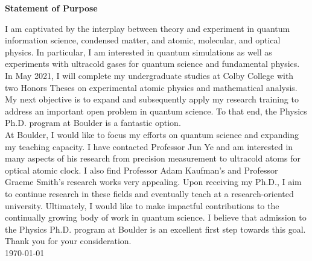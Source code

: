 \documentclass[12pt]{article}
\begin{document}
\begin{center}
	\textbf{Statement of Purpose}
\end{center}
I am captivated by the interplay between theory and experiment in quantum information science, condensed matter, and atomic, molecular, and optical physics. In particular, I am interested in  quantum simulations as well as experiments with ultracold gases for quantum science and fundamental physics. In May 2021, I will complete my undergraduate studies at Colby College with two Honors Theses on experimental atomic physics and mathematical analysis. My next objective is to expand and subsequently apply my research training to address an important open problem in quantum science. To that end, the Physics Ph.D. program at Boulder is a fantastic option.  \\ 

 


At Boulder, I would like to focus my efforts on quantum science and expanding my teaching capacity. I have contacted Professor Jun Ye and am interested in many aspects of his research from precision measurement to ultracold atoms for optical atomic clock. I also find Professor Adam Kaufman's and Professor Graeme Smith's research works very appealing. Upon receiving my Ph.D., I aim to continue research in these fields and eventually teach at a research-oriented university. Ultimately, I would like to make impactful contributions to the continually growing body of work in quantum science. I believe that admission to the Physics Ph.D. program at Boulder is an excellent first step towards this goal. \\


\noindent Thank you for your consideration. \\

\noindent \today
	











	
	
	
	
	
\end{document}
